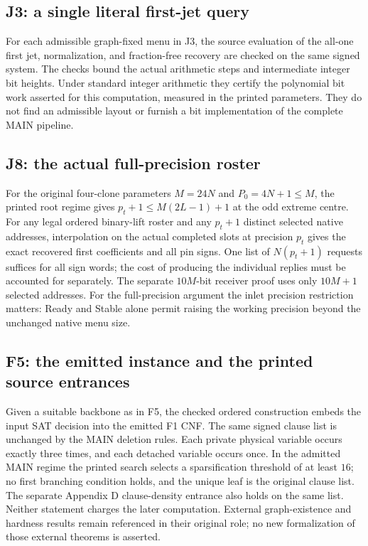 \documentclass[11pt,a4paper]{article}
\begin{document}
\subsection{J3: a single literal first-jet query}
For each admissible graph-fixed menu in J3, the source evaluation of the
all-one first jet, normalization, and fraction-free recovery are checked
on the same signed system. The checks bound the actual arithmetic steps
and intermediate integer bit heights. Under standard integer arithmetic
they certify the polynomial bit work asserted for this computation,
measured in the printed parameters. They do not find an admissible
layout or furnish a bit implementation of the complete MAIN pipeline.

\subsection{J8: the actual full-precision roster}
For the original four-clone parameters $M=24N$ and $P_0=4N+1\le M$,
the printed root regime gives $p_t+1\le M(2L-1)+1$ at the odd extreme centre.
For any legal ordered binary-lift roster and any $p_t+1$ distinct
selected native addresses, interpolation on the actual completed slots
at precision $p_t$ gives the exact recovered first coefficients and all
pin signs. One list of $N(p_t+1)$ requests suffices for all sign words;
the cost of producing the individual replies must be accounted for separately. The separate
$10M$-bit receiver proof uses only $10M+1$ selected addresses. For the
full-precision argument the inlet precision restriction matters: Ready
and Stable alone permit raising the working precision beyond the
unchanged native menu size.

\subsection{F5: the emitted instance and the printed source entrances}
Given a suitable backbone as in F5, the checked ordered construction
embeds the input SAT decision into the emitted F1 CNF. The same signed
clause list is unchanged by the MAIN deletion rules. Each private
physical variable occurs exactly three times, and each detached variable
occurs once. In the admitted MAIN regime the printed search selects
a sparsification threshold of at least $16$; no first branching
condition holds, and the unique leaf is the original clause list.
The separate Appendix D clause-density entrance also holds on the
same list. Neither statement charges the later computation.
External graph-existence and hardness results remain referenced in
their original role; no new formalization of those external theorems is
asserted.
\end{document}
